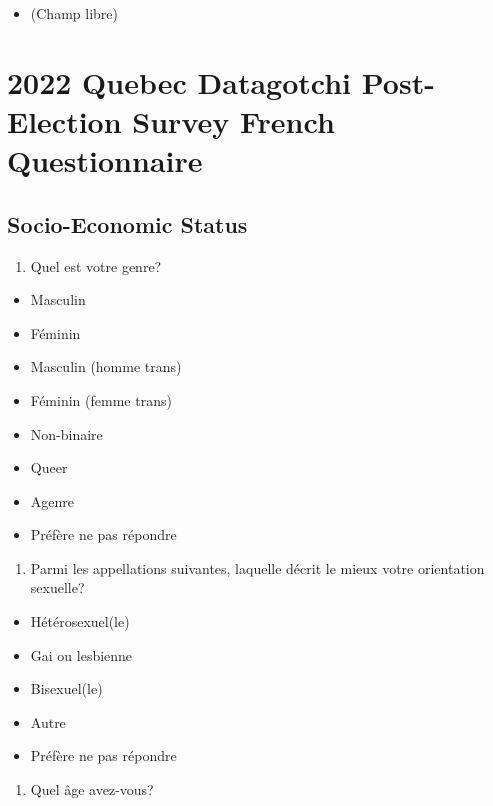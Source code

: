 \documentclass[
  letterpaper,
  DIV=11,
  numbers=noendperiod]{scrreprt}
\providecommand{\tightlist}{%
  \setlength{\itemsep}{0pt}\setlength{\parskip}{0pt}}\usepackage{longtable,booktabs,array}
\begin{document}
\begin{itemize}
\tightlist
\item
  (Champ libre)
\end{itemize}

\chapter{2022 Quebec Datagotchi Post-Election Survey French
Questionnaire}\label{sec-appendix3}

\section{Socio-Economic Status}\label{socio-economic-status}

\begin{enumerate}
\def\labelenumi{\arabic{enumi}.}
\tightlist
\item
  Quel est votre genre?
\end{enumerate}

\begin{itemize}
\tightlist
\item
  Masculin
\item
  Féminin
\item
  Masculin (homme trans)
\item
  Féminin (femme trans)
\item
  Non-binaire
\item
  Queer
\item
  Agenre
\item
  Préfère ne pas répondre
\end{itemize}

\begin{enumerate}
\def\labelenumi{\arabic{enumi}.}
\setcounter{enumi}{1}
\tightlist
\item
  Parmi les appellations suivantes, laquelle décrit le mieux votre
  orientation sexuelle?
\end{enumerate}

\begin{itemize}
\tightlist
\item
  Hétérosexuel(le)
\item
  Gai ou lesbienne
\item
  Bisexuel(le)
\item
  Autre
\item
  Préfère ne pas répondre
\end{itemize}

\begin{enumerate}
\def\labelenumi{\arabic{enumi}.}
\setcounter{enumi}{2}
\tightlist
\item
  Quel âge avez-vous?
\end{enumerate}
\end{document}
